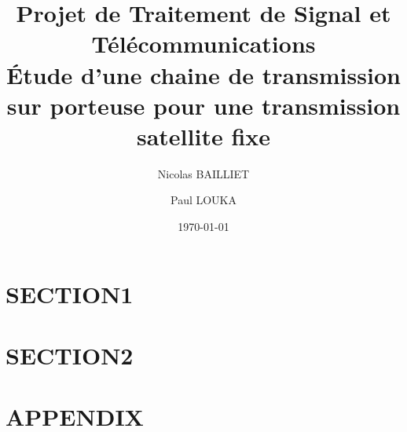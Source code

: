 \documentclass[a4paper, 12pt]{article}
\title{Projet de Traitement de Signal et Télécommunications \\
\Large Étude d’une chaine de transmission sur porteuse pour une transmission
satellite ﬁxe}
\author{Nicolas BAILLIET \and Paul LOUKA}
\date{\today}
\begin{document}
\maketitle
\tableofcontents

\clearpage
\section{SECTION1}


\clearpage
\section{SECTION2}


\clearpage
\appendix
\section{APPENDIX}
\end{document}
